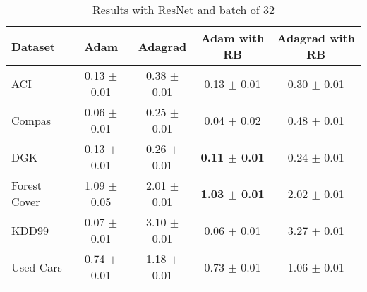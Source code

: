 \begin{table}[hb!]%
  \caption{Results with ResNet and batch of 32}
  \label{tab:resultsRESNET32}
  \begin{footnotesize}
  \begin{center}
  \begin{tabular}{l|cccc}
    \toprule
    Dataset      & Adam         & Adagrad      & Adam with RB          & Adagrad with RB \\
    \midrule                                                                                     
    ACI          & 0.13 $\pm$ 0.01 & 0.38 $\pm$ 0.01 & 0.13 $\pm$ 0.01          & 0.30 $\pm$ 0.01 \\
    Compas       & 0.06 $\pm$ 0.01 & 0.25 $\pm$ 0.01 & 0.04 $\pm$ 0.02          & 0.48 $\pm$ 0.01 \\
    DGK          & 0.13 $\pm$ 0.01 & 0.26 $\pm$ 0.01 & \textbf{0.11 $\pm$ 0.01} & 0.24 $\pm$ 0.01 \\
    Forest Cover & 1.09 $\pm$ 0.05 & 2.01 $\pm$ 0.01 & \textbf{1.03 $\pm$ 0.01} & 2.02 $\pm$ 0.01 \\
    KDD99        & 0.07 $\pm$ 0.01 & 3.10 $\pm$ 0.01 & 0.06 $\pm$ 0.01          & 3.27 $\pm$ 0.01 \\
    Used Cars    & 0.74 $\pm$ 0.01 & 1.18 $\pm$ 0.01 & 0.73 $\pm$ 0.01          & 1.06 $\pm$ 0.01 \\
  \bottomrule
\end{tabular}
\end{center}
\end{footnotesize}
\end{table}





